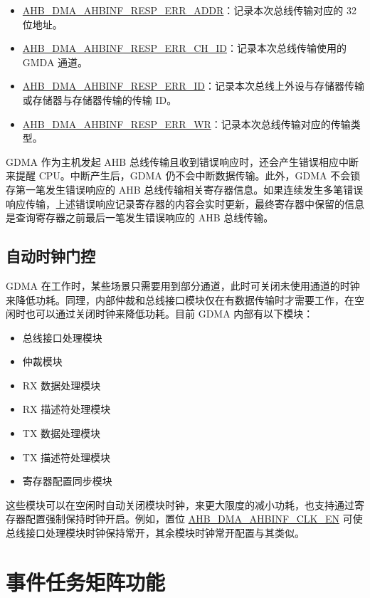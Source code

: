 \documentclass[main\_\_CN.tex]{subfiles}
\begin{document}
\begin{itemize}
    \item \hyperref[fielddesc:AHBDMAAHBINFRESPERRADDR]{AHB\_DMA\_AHBINF\_RESP\_ERR\_ADDR}：记录本次总线传输对应的 32 位地址。
    \item \hyperref[fielddesc:AHBDMAAHBINFRESPERRCHID]{AHB\_DMA\_AHBINF\_RESP\_ERR\_CH\_ID}：记录本次总线传输使用的 GMDA 通道。
    \item \hyperref[fielddesc:AHBDMAAHBINFRESPERRID]{AHB\_DMA\_AHBINF\_RESP\_ERR\_ID}：记录本次总线上外设与存储器传输或存储器与存储器传输的传输 ID。
    \item \hyperref[fielddesc:AHBDMAAHBINFRESPERRWR]{AHB\_DMA\_AHBINF\_RESP\_ERR\_WR}：记录本次总线传输对应的传输类型。
\end{itemize}

GDMA 作为主机发起 AHB 总线传输且收到错误响应时，还会产生错误相应中断来提醒 CPU。中断产生后，GDMA 仍不会中断数据传输。此外，GDMA 不会锁存第一笔发生错误响应的 AHB 总线传输相关寄存器信息。如果连续发生多笔错误响应传输，上述错误响应记录寄存器的内容会实时更新，最终寄存器中保留的信息是查询寄存器之前最后一笔发生错误响应的 AHB 总线传输。

\subsection{自动时钟门控}\label{sec:dma-auto-clk-gating}

GDMA 在工作时，某些场景只需要用到部分通道，此时可关闭未使用通道的时钟来降低功耗。同理，内部仲裁和总线接口模块仅在有数据传输时才需要工作，在空闲时也可以通过关闭时钟来降低功耗。目前 GDMA 内部有以下模块：
\begin{itemize}
    \item 总线接口处理模块
    \item 仲裁模块
    \item RX 数据处理模块
    \item RX 描述符处理模块
    \item TX 数据处理模块
    \item TX 描述符处理模块
    \item 寄存器配置同步模块
\end{itemize}

这些模块可以在空闲时自动关闭模块时钟，来更大限度的减小功耗，也支持通过寄存器配置强制保持时钟开启。例如，置位 \hyperref[fielddesc:AHBDMAAHBINFCLKEN]{AHB\_DMA\_AHBINF\_CLK\_EN} 可使总线接口处理模块时钟保持常开，其余模块时钟常开配置与其类似。


\section{事件任务矩阵功能} \label{sec:dma-etm-func}
\end{document}
